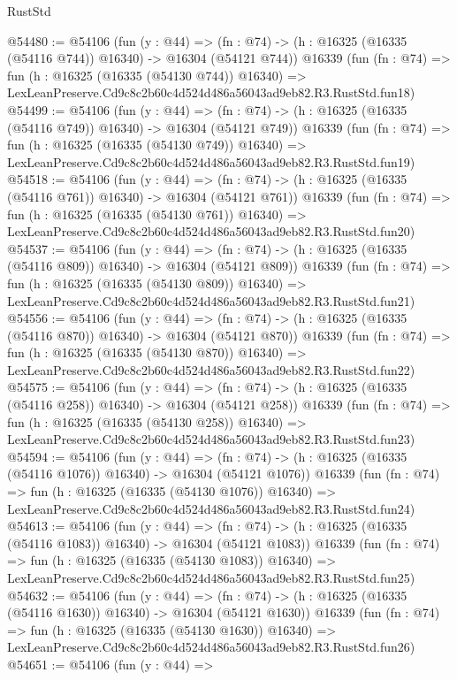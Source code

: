\begin{lexlean}{RustStd}
\begin{coremodule}
@54480 := @54106
    (fun (y : @44) =>
    (fn : @74) -> (h : @16325 (@16335 (@54116 @744)) @16340) -> @16304 (@54121 @744))
    @16339
    (fun (fn : @74) =>
    fun (h : @16325 (@16335 (@54130 @744)) @16340) =>
    LexLeanPreserve.Cd9c8c2b60c4d524d486a56043ad9eb82.R3.RustStd.fun18)
@54499 := @54106
    (fun (y : @44) =>
    (fn : @74) -> (h : @16325 (@16335 (@54116 @749)) @16340) -> @16304 (@54121 @749))
    @16339
    (fun (fn : @74) =>
    fun (h : @16325 (@16335 (@54130 @749)) @16340) =>
    LexLeanPreserve.Cd9c8c2b60c4d524d486a56043ad9eb82.R3.RustStd.fun19)
@54518 := @54106
    (fun (y : @44) =>
    (fn : @74) -> (h : @16325 (@16335 (@54116 @761)) @16340) -> @16304 (@54121 @761))
    @16339
    (fun (fn : @74) =>
    fun (h : @16325 (@16335 (@54130 @761)) @16340) =>
    LexLeanPreserve.Cd9c8c2b60c4d524d486a56043ad9eb82.R3.RustStd.fun20)
@54537 := @54106
    (fun (y : @44) =>
    (fn : @74) -> (h : @16325 (@16335 (@54116 @809)) @16340) -> @16304 (@54121 @809))
    @16339
    (fun (fn : @74) =>
    fun (h : @16325 (@16335 (@54130 @809)) @16340) =>
    LexLeanPreserve.Cd9c8c2b60c4d524d486a56043ad9eb82.R3.RustStd.fun21)
@54556 := @54106
    (fun (y : @44) =>
    (fn : @74) -> (h : @16325 (@16335 (@54116 @870)) @16340) -> @16304 (@54121 @870))
    @16339
    (fun (fn : @74) =>
    fun (h : @16325 (@16335 (@54130 @870)) @16340) =>
    LexLeanPreserve.Cd9c8c2b60c4d524d486a56043ad9eb82.R3.RustStd.fun22)
@54575 := @54106
    (fun (y : @44) =>
    (fn : @74) -> (h : @16325 (@16335 (@54116 @258)) @16340) -> @16304 (@54121 @258))
    @16339
    (fun (fn : @74) =>
    fun (h : @16325 (@16335 (@54130 @258)) @16340) =>
    LexLeanPreserve.Cd9c8c2b60c4d524d486a56043ad9eb82.R3.RustStd.fun23)
@54594 := @54106
    (fun (y : @44) =>
    (fn : @74) -> (h : @16325 (@16335 (@54116 @1076)) @16340) -> @16304 (@54121 @1076))
    @16339
    (fun (fn : @74) =>
    fun (h : @16325 (@16335 (@54130 @1076)) @16340) =>
    LexLeanPreserve.Cd9c8c2b60c4d524d486a56043ad9eb82.R3.RustStd.fun24)
@54613 := @54106
    (fun (y : @44) =>
    (fn : @74) -> (h : @16325 (@16335 (@54116 @1083)) @16340) -> @16304 (@54121 @1083))
    @16339
    (fun (fn : @74) =>
    fun (h : @16325 (@16335 (@54130 @1083)) @16340) =>
    LexLeanPreserve.Cd9c8c2b60c4d524d486a56043ad9eb82.R3.RustStd.fun25)
@54632 := @54106
    (fun (y : @44) =>
    (fn : @74) -> (h : @16325 (@16335 (@54116 @1630)) @16340) -> @16304 (@54121 @1630))
    @16339
    (fun (fn : @74) =>
    fun (h : @16325 (@16335 (@54130 @1630)) @16340) =>
    LexLeanPreserve.Cd9c8c2b60c4d524d486a56043ad9eb82.R3.RustStd.fun26)
@54651 := @54106
    (fun (y : @44) =>

\end{coremodule}
\end{lexlean}
